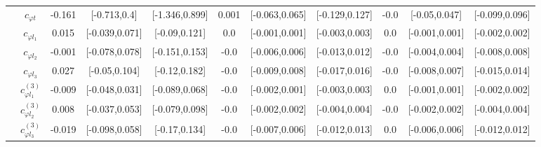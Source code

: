 \documentclass{article}
\begin{document}
\begin{table}[H]
\begin{tabular}{|c|c|c|c|c|c|c|c|c|c|c|}
 & $c_{\varphi t}$ & -0.161                             & [-0.713,0.4]                                 & [-1.346,0.899] & 0.001                             & [-0.063,0.065]                                 & [-0.129,0.127] & -0.0                             & [-0.05,0.047]                                 & [-0.099,0.096] \\ \cline{2-11}
 & $c_{\varphi l_1}$ & 0.015                             & [-0.039,0.071]                                 & [-0.09,0.121] & 0.0                             & [-0.001,0.001]                                 & [-0.003,0.003] & 0.0                             & [-0.001,0.001]                                 & [-0.002,0.002] \\ \cline{2-11}
 & $c_{\varphi l_2}$ & -0.001                             & [-0.078,0.078]                                 & [-0.151,0.153] & -0.0                             & [-0.006,0.006]                                 & [-0.013,0.012] & -0.0                             & [-0.004,0.004]                                 & [-0.008,0.008] \\ \cline{2-11}
 & $c_{\varphi l_3}$ & 0.027                             & [-0.05,0.104]                                 & [-0.12,0.182] & -0.0                             & [-0.009,0.008]                                 & [-0.017,0.016] & -0.0                             & [-0.008,0.007]                                 & [-0.015,0.014] \\ \cline{2-11}
 & $c_{\varphi l_1}^{(3)}$ & -0.009                             & [-0.048,0.031]                                 & [-0.089,0.068] & -0.0                             & [-0.002,0.001]                                 & [-0.003,0.003] & 0.0                             & [-0.001,0.001]                                 & [-0.002,0.002] \\ \cline{2-11}
 & $c_{\varphi l_2}^{(3)}$ & 0.008                             & [-0.037,0.053]                                 & [-0.079,0.098] & -0.0                             & [-0.002,0.002]                                 & [-0.004,0.004] & -0.0                             & [-0.002,0.002]                                 & [-0.004,0.004] \\ \cline{2-11}
 & $c_{\varphi l_3}^{(3)}$ & -0.019                             & [-0.098,0.058]                                 & [-0.17,0.134] & -0.0                             & [-0.007,0.006]                                 & [-0.012,0.013] & 0.0                             & [-0.006,0.006]                                 & [-0.012,0.012] \\ \cline{2-11}

\end{tabular}
\end{table}
\end{document}

